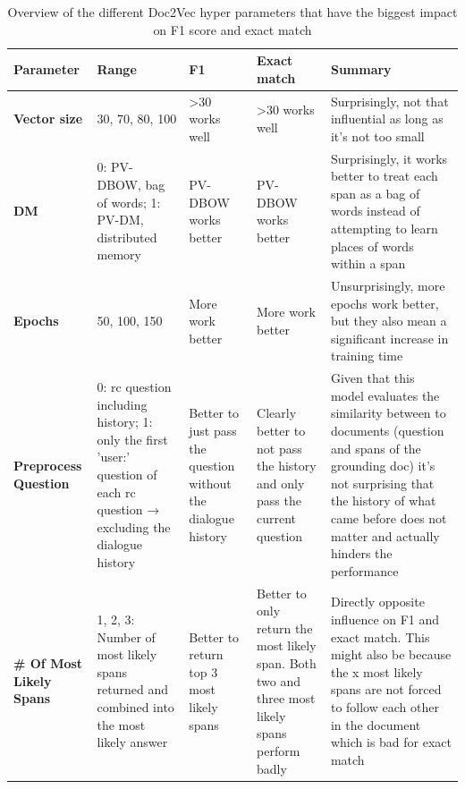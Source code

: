 \documentclass[11pt]{article}
\begin{document}
    \begin{table}[p]
        \centering
        \begin{tabularx}{\textwidth} {|X|X|X|X|X|}
            \hline
            \textbf{Parameter} &
            \textbf{Range} &
            \textbf{F1} &
            \textbf{Exact match} &
            \textbf{Summary} \\ \hline
            \textbf{Vector size} &
            30, 70, 80, 100 &
            \textgreater{}30 works well &
            \textgreater{}30 works well &
            Surprisingly, not that influential as long as it's not too small \\ \hline
            \textbf{DM} &
            0: PV-DBOW, bag of words; 1: PV-DM, distributed memory &
            PV-DBOW works better &
            PV-DBOW works better &
            Surprisingly, it works better to treat each span as a bag of words instead of attempting to learn places of words within a span \\ \hline
            \textbf{Epochs} &
            50, 100, 150 &
            More work better &
            More work better &
            Unsurprisingly, more epochs work better, but they also mean a significant increase in training time \\ \hline
            \textbf{Preprocess Question} &
            0: rc question including history; 1: only the first 'user:' question of each rc question → excluding the dialogue history &
            Better to just pass the question without the dialogue history &
            Clearly better to not pass the history and only pass the current question &
            Given that this model evaluates the similarity between to documents (question and spans of the grounding doc)
            it's not surprising that the history of what came before does not matter and actually hinders the performance \\ \hline
            \textbf{\# Of Most Likely Spans} &
            1, 2, 3: Number of most likely spans returned and combined into the most likely answer &
            Better to return top 3 most likely spans &
            Better to only return the most likely span. Both two and three most likely spans perform badly &
            Directly opposite influence on F1 and exact match. This might also be because the x most likely spans are not
            forced to follow each other in the document which is bad for exact match \\ \hline
        \end{tabularx}
        \caption{Overview of the different Doc2Vec hyper parameters that have the biggest impact on F1 score and exact match}
        \label{table:simple-doc2vec-results}
    \end{table}
\end{document}
